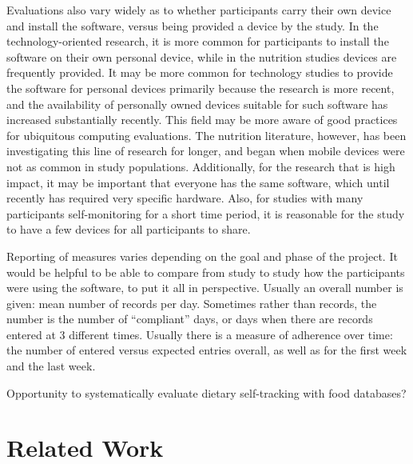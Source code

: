 Evaluations also vary widely as to whether participants carry their own device and install the software, versus being provided a device by the study. In the technology-oriented research, it is more common for participants to install the software on their own personal device, while in the nutrition studies devices are frequently provided. It may be more common for technology studies to provide the software for personal devices primarily because the research is more recent, and the availability of personally owned devices suitable for such software has increased substantially recently. This field may be more aware of good practices for ubiquitous computing evaluations. The nutrition literature, however, has been investigating this line of research for longer, and began when mobile devices were not as common in study populations. Additionally, for the research that is high impact, it may be important that everyone has the same software, which until recently has required very specific hardware. Also, for studies with many participants self-monitoring for a short time period, it is reasonable for the study to have a few devices for all participants to share. 

Reporting of measures varies depending on the goal and phase of the project. It would be helpful to be able to compare from study to study how the participants were using the software, to put it all in perspective. Usually an overall number is given: mean number of records per day. Sometimes rather than records, the number is the number of ``compliant'' days, or days when there are records entered at 3 different times. Usually there is a measure of adherence over time: the number of entered versus expected entries overall, as well as for the first week and the last week. 

Opportunity to systematically evaluate dietary self-tracking with food databases? 


\section{Related Work}
